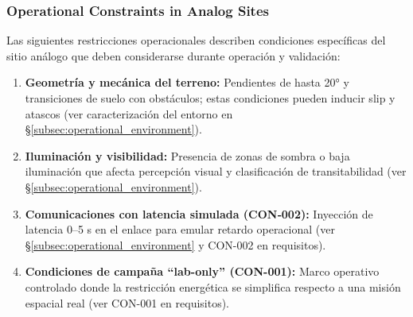 \subsubsection{Operational Constraints in Analog Sites}\label{subsec:operational_constraints}

Las siguientes restricciones operacionales describen condiciones específicas del sitio análogo que deben considerarse durante operación y validación:


\begin{enumerate}
    \item \textbf{Geometría y mecánica del terreno:} Pendientes de hasta 20° y transiciones de suelo con obstáculos; estas condiciones pueden inducir slip y atascos (ver caracterización del entorno en \S\ref{subsec:operational_environment}).
    \item \textbf{Iluminación y visibilidad:} Presencia de zonas de sombra o baja iluminación que afecta percepción visual y clasificación de transitabilidad (ver §\ref{subsec:operational_environment}).
    \item \textbf{Comunicaciones con latencia simulada (CON‑002):} Inyección de latencia 0–5 s en el enlace para emular retardo operacional (ver §\ref{subsec:operational_environment} y CON-002 en requisitos).
    \item \textbf{Condiciones de campaña ``lab-only'' (CON-001):} Marco operativo controlado donde la restricción energética se simplifica respecto a una misión espacial real (ver CON-001 en requisitos).
\end{enumerate}
